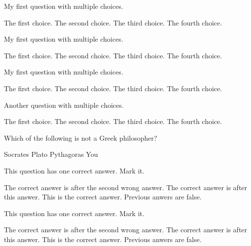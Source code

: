 \documentclass{exam}
\begin{document}
\begin{questions}

\question My first question with multiple choices.

\begin{choices}
   \choice The first choice.
   \choice The second choice.
   \choice The third choice.
   \choice The fourth choice.
\end{choices}

\question My first question with multiple choices.

  \begin{oneparchoices}
    \choice The first choice.
    \choice The second choice.
    \choice The third choice.
    \choice The fourth choice.
  \end{oneparchoices}


  \question My first question with multiple choices.
\begin{checkboxes}
    \choice The first choice.
    \choice The second choice.
    \choice The third choice.
    \choice The fourth choice.
\end{checkboxes}


\question Another question with multiple choices.

\begin{oneparcheckboxes}
    \choice The first choice.
    \choice The second choice.
    \choice The third choice.
    \choice The fourth choice.
\end{oneparcheckboxes}

 \checkboxchar{$\Box$}
 \checkedchar{$\blacksquare$}
 \question Which of the following is not a Greek philosopher?

        \begin{oneparcheckboxes}
            \choice Socrates
            \choice Plato
            \choice Pythagoras
            \CorrectChoice You
        \end{oneparcheckboxes}


\question This question has one correct answer. Mark it.

  \begin{checkboxes}
    \choice The correct answer is after the second wrong answer.
    \choice The correct answer is after this answer.
    \choice This is the correct answer.
    \CorrectChoice Previous anwers are false.
   \end{checkboxes}
   \printanswers

   \question This question has one correct answer. Mark it.

   \begin{checkboxes}
     \choice The correct answer is after the second wrong answer.
     \choice The correct answer is after this answer.
     \choice This is the correct answer.
     \CorrectChoice Previous anwers are false.
   \end{checkboxes}


\end{questions}
\end{document}
